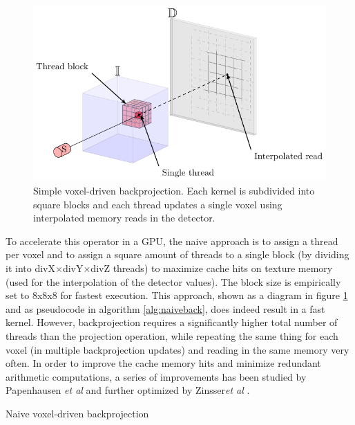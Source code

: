 \begin{figure}
\begin{center}

\includegraphics{GPUmethods/simplebackproj-figure0.pdf} 
\end{center}

\caption[Diagram of the voxel driven backproejction]{\label{fig:simpleback} Simple voxel-driven backprojection. Each kernel is subdivided into square blocks and each thread updates a single voxel using interpolated memory reads in the detector.} 
\end{figure}


To accelerate this operator in a GPU, the naive approach is to assign a thread per voxel and to assign a square amount of threads to a single block (by dividing it into divX$\times$divY$\times$divZ threads) to maximize cache hits on texture memory (used for the interpolation of the detector values). The block size is empirically set to 8x8x8 for fastest execution. This approach, shown as a diagram in figure \ref{fig:simpleback} and as pseudocode in algorithm \ref{alg:naiveback}, does indeed result in a fast kernel. However, backprojection requires a significantly higher total number of threads than the projection operation, while repeating the same thing for each voxel (in multiple backprojection updates) and reading in the same memory very often. In order to improve the cache memory hits and minimize redundant arithmetic computations, a series of improvements has been studied by Papenhausen \emph{et al}\cite{papenhausen2011gpu} and further optimized by Zinsser\emph{et al} \cite{zinsser2013systematic}.

\begin{algorithm}

\caption{Naive voxel-driven backprojection
\label{alg:naiveback}}
\begin{algorithmic}[1]


\Ensure{} 
\EndFor

\end{algorithmic}

\end{algorithm}


